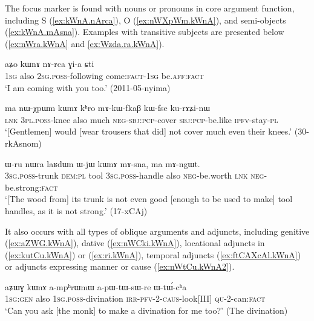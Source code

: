   
The focus marker  is found with nouns or pronouns in core argument function, including S (\ref{ex:kWnA.nArca}), O (\ref{ex:nWXpWm.kWnA}), and semi-objects (\ref{ex:kWnA.mAsna}).  Examples with transitive subjects are presented below (\ref{ex:nWra.kWnA} and \ref{ex:Wzda.ra.kWnA}).

 \begin{exe}
\ex \label{ex:kWnA.nArca}
\gll aʑo kɯnɤ nɤ-rca ɣi-a ɕti  \\
\textsc{1sg} also \textsc{2sg}.\textsc{poss}-following come:\textsc{fact}-\textsc{1sg} be.\textsc{aff}:\textsc{fact} \\
\glt `I am coming with you too.' (2011-05-nyima)
 \end{exe}
 
   \begin{exe}
\ex \label{ex:nWXpWm.kWnA}
\gll    ma nɯ-χpɯm kɯnɤ kʰro mɤ-kɯ-fkaβ kɯ-fse ku-rɤʑi-nɯ  \\
\textsc{lnk} \textsc{3pl}.\textsc{poss}-knee also much \textsc{neg}-\textsc{sbj}:\textsc{pcp}-cover \textsc{sbj}:\textsc{pcp}-be.like \textsc{ipfv}-stay-\textsc{pl} \\
\glt `[Gentlemen] would [wear trousers that did] not cover much even their knees.'  (30-rkAsnom) 
  \end{exe}
  
  \begin{exe}
 \ex \label{ex:kWnA.mAsna}
 \gll   ɯ-ru nɯra laʁdɯn ɯ-jɯ kɯnɤ mɤ-sna, ma mɤ-ngɯt. \\
 \textsc{3sg}.\textsc{poss}-trunk \textsc{dem}:\textsc{pl} tool \textsc{3sg}.\textsc{poss}-handle also \textsc{neg}-be.worth \textsc{lnk}  \textsc{neg}-be.strong:\textsc{fact} \\
 \glt `[The wood from] its trunk is not even good [enough to be used to make] tool handles, as it is not strong.'  (17-xCAj)
  \end{exe}

  
It also occurs with all types of oblique arguments and adjuncts, including genitive  (\ref{ex:aZWG.kWnA}), dative  (\ref{ex:nWCki.kWnA}),  locational adjuncts in  (\ref{ex:kutCu.kWnA}) or  (\ref{ex:ri.kWnA}), temporal adjuncts (\ref{ex:ftCAXcAl.kWnA}) or adjuncts expressing manner or cause (\ref{ex:nWtCu.kWnA2}).  
  
   \begin{exe}
\ex \label{ex:aZWG.kWnA}
\gll aʑɯɣ kɯnɤ a-mpʰrɯmɯ a-pɯ-tɯ-sɯ-re ɯ-tɯ́-cʰa \\
\textsc{1sg}:\textsc{gen} also \textsc{1sg}.\textsc{poss}-divination \textsc{irr}-\textsc{pfv}-2-\textsc{caus}-look[III] \textsc{qu}-2-can:\textsc{fact} \\
\glt `Can you ask [the monk] to make a divination for me too?' (The divination)
\end{exe}  
  
